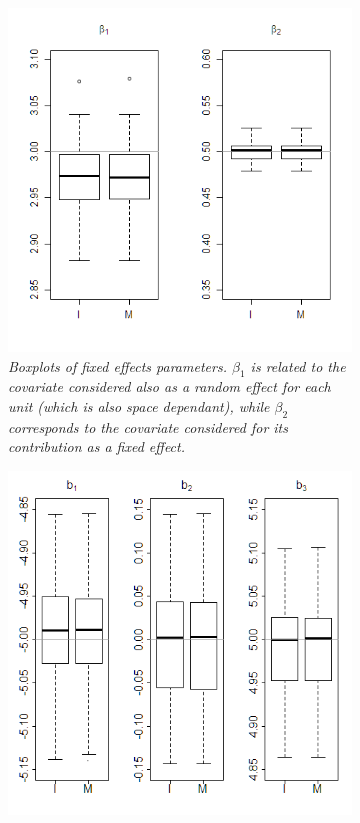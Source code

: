 \begin{figure}
	\centering
	\begin{subfigure}{0.45\textwidth}
		\includegraphics[width=\textwidth]{images/beta.png}
		\centering
		\caption{\textit{Boxplots of fixed effects parameters. $\beta_1$
				is related to the covariate considered also as a random effect
				for each unit (which is also space dependant), while $\beta_2$ corresponds to the covariate
				considered for its contribution	as a fixed effect.}}
		\label{beta}
	\end{subfigure}
	\hfill
	\begin{subfigure}{0.45\textwidth}
		\includegraphics[width=\textwidth]{images/b.png}

\end{subfigure}
\end{figure}
